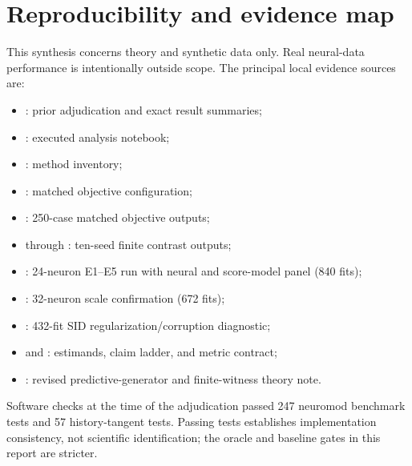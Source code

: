 \documentclass[10pt]{article}
\begin{document}
\appendix

\section{Reproducibility and evidence map}

This synthesis concerns theory and synthetic data only. Real neural-data performance is intentionally outside scope. The principal local evidence sources are:

\begin{itemize}
  \item {}: prior adjudication and exact result summaries;
  \item {}: executed analysis notebook;
  \item {}: method inventory;
  \item {}: matched objective configuration;
  \item {}: 250-case matched objective outputs;
  \item {} through : ten-seed finite contrast outputs;
  \item {}: 24-neuron E1--E5 run with neural and score-model panel (840 fits);
  \item {}: 32-neuron scale confirmation (672 fits);
  \item {}: 432-fit SID regularization/corruption diagnostic;
  \item {} and : estimands, claim ladder, and metric contract;
  \item {}: revised predictive-generator and finite-witness theory note.
\end{itemize}

Software checks at the time of the adjudication passed 247 neuromod benchmark tests and 57 history-tangent tests. Passing tests establishes implementation consistency, not scientific identification; the oracle and baseline gates in this report are stricter.
\end{document}

